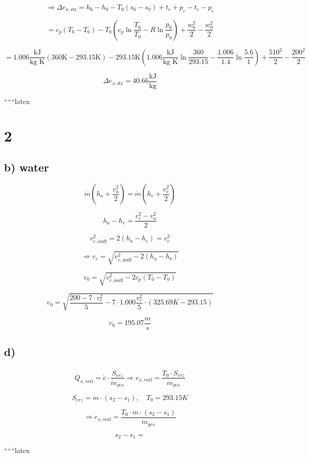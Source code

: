 \[
\Rightarrow \Delta e_{x, \text{str}} = h_6 - h_0 - T_0 (s_6 - s_0) + t_e + p_e - t_e - p_e
\]

\[
= c_p (T_6 - T_0) - T_0 \left( c_p \ln \frac{T_6}{T_0} - R \ln \frac{p_6}{p_0} \right) + \frac{w_6^2}{2} - \frac{w_0^2}{2}
\]

\[
= 1.006 \frac{\text{kJ}}{\text{kg K}} \left( 360 \text{K} - 293.15 \text{K} \right) - 293.15 \text{K} \left( 1.006 \frac{\text{kJ}}{\text{kg K}} \ln \frac{360}{293.15} - \frac{1.006}{1.4} \ln \frac{5.6}{1} \right) + \frac{510^2}{2} - \frac{200^2}{2}
\]

\[
\Delta e_{x, \text{str}} = \boxed{40.66 \frac{\text{kJ}}{\text{kg}}}
\]

``````latex


\section*{2}
\subsection*{b) water}

\[
\dot{m}(h_a + \frac{v_a^2}{2}) = \dot{m} (h_e + \frac{v_e^2}{2})
\]

\[
h_a - h_e = \frac{v_e^2 - v_a^2}{2}
\]

\[
v_{e, \text{isuff}}^2 = 2(h_a - h_e) = v_e^2
\]

\[
\Rightarrow v_e = \sqrt{v_{e, \text{isuff}}^2 - 2(h_a - h_b)}
\]

\[
v_0 = \sqrt{v_{e, \text{isuff}}^2 - 2c_p(T_0 - T_0)}
\]

\[
v_0 = \sqrt{\frac{200 - 7 \cdot v_e^2}{5} - 7 \cdot 1.000 \frac{v_e^2}{5} \cdot (325.69K - 293.15)}
\]

\[
v_0 = 195.07 \frac{m}{s}
\]

\subsection*{d)}

\[
\dot{Q}_{x, \text{verl}} = \dot{c} \cdot \frac{\dot{S}_{erz}}{\dot{m}_{ges}} \Rightarrow e_{x, \text{verl}} = \frac{T_0 \cdot S_{erz}}{\dot{m}_{ges}}
\]

\[
S_{erz} = \dot{m} \cdot (s_2 - s_1), \quad T_0 = 293.15K
\]

\[
\Rightarrow e_{x, \text{verl}} = \frac{T_0 \cdot \dot{m} \cdot (s_2 - s_1)}{\dot{m}_{ges}}
\]

\[
s_2 - s_1 =
\]

``````latex


